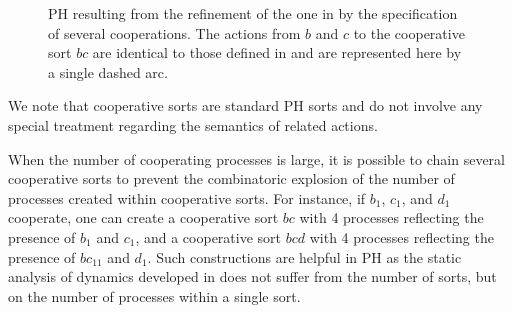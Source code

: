\begin{figure}[p]
\centering
{}

\caption{\label{fig:runningPH-2}
PH resulting from the refinement of the one in  by the
specification of several cooperations.
The actions from $b$ and $c$ to the cooperative sort $bc$ are identical to those defined in
 and are represented here by a single dashed arc.
}
\end{figure}

We note that cooperative sorts are standard PH sorts and do not involve any
special treatment regarding the semantics of related actions.

When the number of cooperating processes is large, it is possible to chain several cooperative sorts
to prevent the combinatoric explosion of the number of processes created within cooperative sorts.
For instance, if $b_1$, $c_1$, and $d_1$ cooperate, one can create a cooperative sort $bc$ with 4
processes reflecting the presence of $b_1$ and $c_1$, and a cooperative sort $bcd$ with 4 processes
reflecting the presence of $bc_{11}$ and $d_1$.  Such constructions are helpful in PH
as the static analysis of dynamics developed in \cite{PMR12-MSCS} does not suffer from the number of
sorts, but on the number of processes within a single sort.


